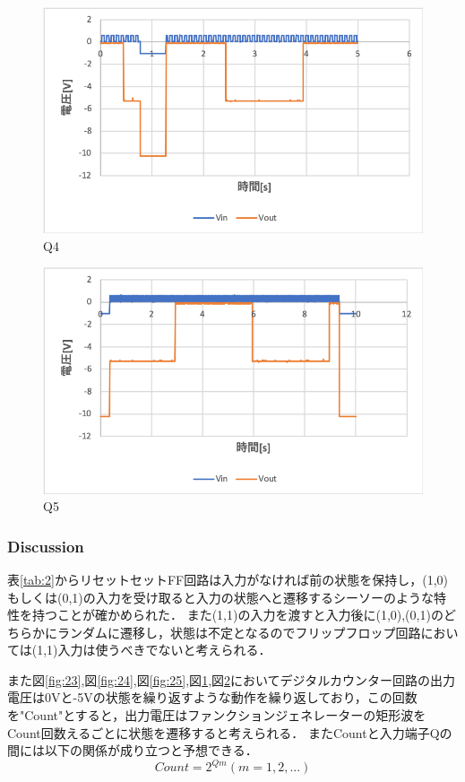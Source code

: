 \documentclass[11pt, a4paper,twocolumn]{jarticle}
\begin{document}
\begin{figure}[htbp]
 \begin{center}
  \includegraphics[width=0.8\linewidth]{fig26.png}
 \end{center}
 \caption{Q4}
 \label{fig:26}
\end{figure}

\begin{figure}[htbp]
 \begin{center}
  \includegraphics[width=0.8\linewidth]{fig27.png}
 \end{center}
 \caption{Q5}
 \label{fig:27}
\end{figure}


\subsubsection{Discussion}
表\ref{tab:2}からリセットセットFF回路は入力がなければ前の状態を保持し，(1,0)もしくは(0,1)の入力を受け取ると入力の状態へと遷移するシーソーのような特性を持つことが確かめられた．
また(1,1)の入力を渡すと入力後に(1,0),(0,1)のどちらかにランダムに遷移し，状態は不定となるのでフリップフロップ回路においては(1,1)入力は使うべきでないと考えられる．

また図\ref{fig:23},図\ref{fig:24},図\ref{fig:25},図\ref{fig:26},図\ref{fig:27}においてデジタルカウンター回路の出力電圧は0Vと-5Vの状態を繰り返すような動作を繰り返しており，この回数を"Count"とすると，出力電圧はファンクションジェネレーターの矩形波をCount回数えるごとに状態を遷移すると考えられる．
またCountと入力端子Qの間には以下の関係が成り立つと予想できる．
\begin{equation}
    Count = 2^{Qm} (m=1,2,...)
\end{equation}
\end{document}
